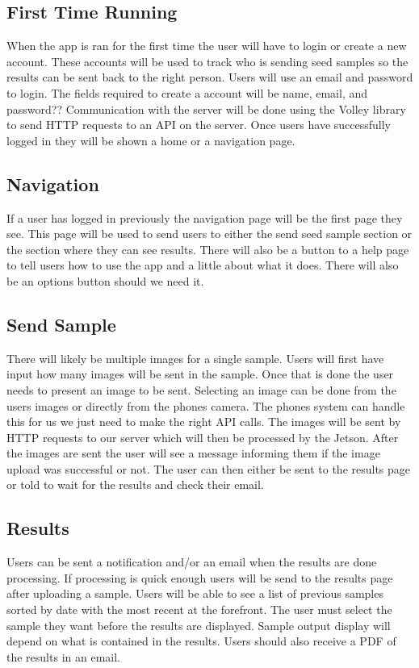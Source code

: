 \documentclass[onecolumn, draftclsnofoot,10pt, compsoc]{IEEEtran}
\begin{document}
	\subsection{First Time Running}
		When the app is ran for the first time the user will have to login or create a new account.
		These accounts will be used to track who is sending seed samples so the results can be sent back to the right person.
		Users will use an email and password to login.
		The fields required to create a account will be name, email, and password??
		Communication with the server will be done using the Volley library to send HTTP requests to an API on the server.
		Once users have successfully logged in they will be shown a home or a navigation page.

	\subsection{Navigation}
		If a user has logged in previously the navigation page will be the first page they see.
		This page will be used to send users to either the send seed sample section or the section where they can see results.
		There will also be a button to a help page to tell users how to use the app and a little about what it does.
		There will also be an options button should we need it.

	\subsection{Send Sample}
		There will likely be multiple images for a single sample.
		Users will first have input how many images will be sent in the sample.
		Once that is done the user needs to present an image to be sent.
		Selecting an image can be done from the users images or directly from the phones camera.
		The phones system can handle this for us we just need to make the right API calls.
		The images will be sent by HTTP requests to our server which will then be processed by the Jetson.
		After the images are sent the user will see a message informing them if the image upload was successful or not.
		The user can then either be sent to the results page or told to wait for the results and check their email.

	\subsection{Results}
		Users can be sent a notification and/or an email when the results are done processing.
		If processing is quick enough users will be send to the results page after uploading a sample.
		Users will be able to see a list of previous samples sorted by date with the most recent at the forefront.
		The user must select the sample they want before the results are displayed.
		Sample output display will depend on what is contained in the results.
		Users should also receive a PDF of the results in an email.
		



\end{document}

